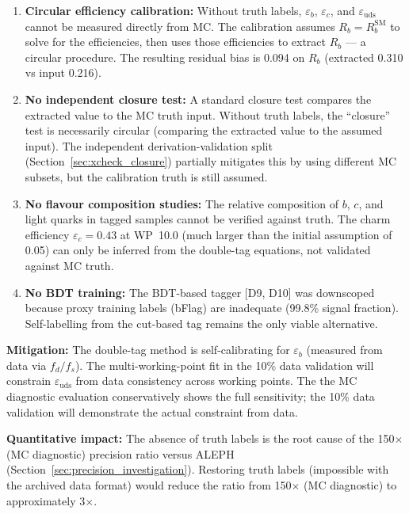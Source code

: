 \documentclass[11pt,a4paper]{article}
\begin{document}
\begin{enumerate}
\item \textbf{Circular efficiency calibration:} Without truth labels, $\varepsilon_b$,
$\varepsilon_c$, and $\varepsilon_\mathrm{uds}$ cannot be measured directly from MC.
The calibration assumes $R_b = R_b^\mathrm{SM}$ to solve for the efficiencies, then
uses those efficiencies to extract $R_b$ --- a circular procedure. The resulting
residual bias is 0.094 on $R_b$ (extracted 0.310 vs input 0.216).

\item \textbf{No independent closure test:} A standard closure test compares the
extracted value to the MC truth input. Without truth labels, the ``closure'' test
is necessarily circular (comparing the extracted value to the assumed input). The
independent derivation-validation split (Section~\ref{sec:xcheck_closure}) partially
mitigates this by using different MC subsets, but the calibration truth is still
assumed.

\item \textbf{No flavour composition studies:} The relative composition of $b$, $c$,
and light quarks in tagged samples cannot be verified against truth. The charm
efficiency $\varepsilon_c = 0.43$ at WP~10.0 (much larger than the initial assumption
of 0.05) can only be inferred from the double-tag equations, not validated against
MC truth.

\item \textbf{No BDT training:} The BDT-based tagger [D9, D10] was downscoped
because proxy training labels (bFlag) are inadequate (99.8\% signal fraction).
Self-labelling from the cut-based tag remains the only viable alternative.
\end{enumerate}

\textbf{Mitigation:} The double-tag method is self-calibrating for $\varepsilon_b$
(measured from data via $f_d / f_s$). The multi-working-point fit in the 10\% data validation will
constrain $\varepsilon_\mathrm{uds}$ from data consistency across working points.
The the MC diagnostic evaluation conservatively shows the full sensitivity; the 10\% data validation will
demonstrate the actual constraint from data.

\textbf{Quantitative impact:} The absence of truth labels is the root cause of
the 150$\times$ (MC diagnostic) precision ratio versus ALEPH (Section~\ref{sec:precision_investigation}).
Restoring truth labels (impossible with the archived data format) would reduce the
ratio from 150$\times$ (MC diagnostic) to approximately 3$\times$.
\end{document}
